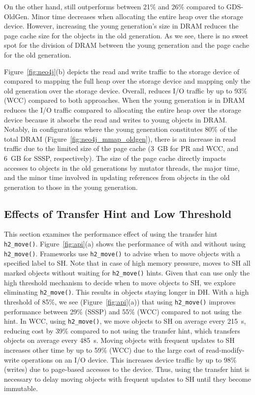 On the other hand, \teraheapName{} still outperforms between 21\% and 26\% compared to
GDS-OldGen. Minor \teraheapGC time decreases when allocating the entire heap over the
storage device. However, increasing the young generation's size in DRAM reduces
the page cache size for the objects in the old generation. As we see, there is
no sweet spot for the division of DRAM between the young generation and the
page cache for the old generation.

Figure~\ref{fig:neo4j}(b) depicts the read and write traffic to the storage
device of \teraheapName{} compared to mapping the full heap over the storage device and
mapping only the old generation over the storage device. Overall, \teraheapName{}
reduces I/O traffic by up to 93\% (WCC) compared to both approaches. When the
young generation is in DRAM reduces the I/O traffic compared to allocating the
entire heap over the storage device because it absorbs the read and writes to
young objects in DRAM. Notably, in configurations where the young generation
constitutes 80\% of the total DRAM (Figure~\ref{fig:neo4j_mmap_oldgen}), there
is an increase in read traffic due to the limited size of the page cache
(\SI{3}{GB} for PR and WCC, and \SI{6}{GB} for SSSP, respectively). The size of
the page cache directly impacts accesses to objects in the old generations by
mutator threads, the major \teraheapGC time, and the minor \teraheapGC time involved in updating
references from objects in the old generation to those in the young generation.

\subsection{Effects of Transfer Hint and Low Threshold}
\label{sec:hints}

This section examines the performance effect of using the transfer
hint \texttt{h2\_move()}. Figure~\ref{fig:api}(a) shows the
performance of \teraheapName{} with and without using \texttt{h2\_move()}.
Frameworks use \texttt{h2\_move()} to advise \teraheapName{} when to move
objects with a specified label to SH. Note that in case of high memory pressure,
\teraheapName{} moves to SH all marked objects without waiting for
\texttt{h2\_move()} hints. Given that \teraheapName{} can use only the high
threshold mechanism to decide when to move objects to SH, we explore
eliminating \texttt{h2\_move()}. This results in objects staying
longer in DH. With a high threshold of 85\%, we see
(Figure~\ref{fig:api}(a)) that using \texttt{h2\_move()} improves
\teraheapName{} performance between 29\% (SSSP) and 55\% (WCC) compared to not
using the hint. In WCC, using \texttt{h2\_move()}, we move objects to
SH on average every \SI{215}{s}, reducing \teraheapGC cost by 39\% compared to not
using the transfer hint, which transfers objects on average every
\SI{485}{s}. Moving objects with frequent updates to SH increases
other time by up to 59\% (WCC) due to the large cost of
read-modify-write operations on an I/O device. This increases device
traffic by up to 98\% (writes) due to page-based accesses to the
device. Thus, using the transfer hint is necessary to delay
moving objects with frequent updates to SH until they become
immutable.

